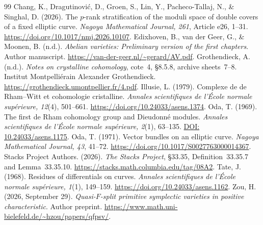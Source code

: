 \documentclass[11pt]{article}
\theoremstyle{definition}\newtheorem{definition}[theorem]{Definition}
\theoremstyle{remark}\newtheorem{remark}[theorem]{Remark}
\begin{document}
\begin{thebibliography}{99}
Chang, K., Dragutinovi\'c, D., Groen, S., Lin, Y., Pacheco-Tallaj, N., \& Singhal, D. (2026). The $p$-rank stratification of the moduli space of double covers of a fixed elliptic curve. \emph{Nagoya Mathematical Journal, 261}, Article e26, 1--31. \url{https://doi.org/10.1017/nmj.2026.10107}.
Edixhoven, B., van der Geer, G., \& Moonen, B. (n.d.). \emph{Abelian varieties: Preliminary version of the first chapters}. Author manuscript. \url{https://van-der-geer.nl/~gerard/AV.pdf}.
Grothendieck, A. (n.d.). \emph{Notes on crystalline cohomology}, cote~4, \S8.5.8, archive sheets~7--8. Institut Montpelli\'erain Alexander Grothendieck. \url{https://grothendieck.umontpellier.fr/4.pdf}.
Illusie, L. (1979). Complexe de de Rham--Witt et cohomologie cristalline. \emph{Annales scientifiques de l'\'Ecole normale sup\'erieure, 12}(4), 501--661. \url{https://doi.org/10.24033/asens.1374}.
Oda, T. (1969). The first de Rham cohomology group and Dieudonn\'e modules. \emph{Annales scientifiques de l'\'Ecole normale sup\'erieure, 2}(1), 63--135. \href{https://doi.org/10.24033/asens.1175}{DOI: 10.24033/asens.1175}.
Oda, T. (1971). Vector bundles on an elliptic curve. \emph{Nagoya Mathematical Journal, 43}, 41--72. \url{https://doi.org/10.1017/S0027763000014367}.
Stacks Project Authors. (2026). \emph{The Stacks Project}, \S33.35, Definition~33.35.7 and Lemma~33.35.10. \url{https://stacks.math.columbia.edu/tag/08A2}.
Tate, J. (1968). Residues of differentials on curves. \emph{Annales scientifiques de l'\'Ecole normale sup\'erieure, 1}(1), 149--159. \url{https://doi.org/10.24033/asens.1162}.
Zou, H. (2026, September 29). \emph{Quasi-$F$-split primitive symplectic varieties in positive characteristic}. Author preprint. \url{https://www.math.uni-bielefeld.de/~hzou/papers/qfpsv/}.
\end{thebibliography}
\end{document}
